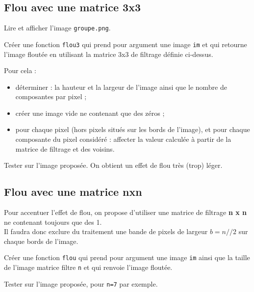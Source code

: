 \subsection*{Flou avec une matrice 3x3}

\begin{question}
Lire et afficher l'image \texttt{groupe.png}.
\end{question}

\begin{question}
Créer une fonction \texttt{flou3} qui prend pour argument une image \texttt{im} et qui retourne l'image floutée en utilisant la matrice 3x3 de filtrage définie ci-dessus.
\end{question}

Pour cela :
\begin{itemize}
\item déterminer : la hauteur et  la largeur de l'image ainsi que le nombre de composantes par pixel ;
\item créer une image vide ne contenant que des zéros ;
\item pour chaque pixel (hors pixels situés sur les bords de l'image), et pour chaque composante du pixel considéré :  affecter la valeur calculée à partir de la matrice de filtrage et des voisins.
\end{itemize}

\begin{question}
Tester sur l'image proposée. On obtient un effet de flou très (trop) léger.
\end{question}

\subsection*{Flou avec une matrice nxn}
Pour accentuer l'effet de flou, on propose d'utiliser une matrice de filtrage \textbf{n x n} ne contenant toujours que des 1.\\
Il faudra donc exclure du traitement une bande de pixels de largeur $b=n//2$ sur chaque bords de l'image.

\begin{question}
Créer une fonction \texttt{flou} qui prend pour argument une image \texttt{im} ainsi que la taille de l'image matrice filtre \texttt{n} et qui renvoie l'image floutée.
\end{question}

\begin{question}
Tester sur l'image proposée, pour \texttt{n=7} par exemple.
\end{question}


